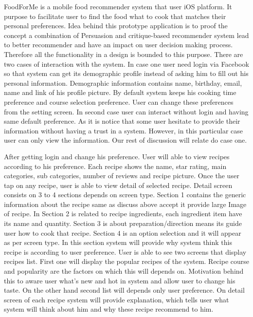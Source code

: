 FoodForMe is a mobile food recommender system that user iOS platform. It purpose to facilitate user to find the food what to cook that matches their personal preferences. Idea behind this prototype application is to proof the concept a combination of Persuasion and critique-based recommender system lead to better recommender and have an impact on user decision making process. Therefore all the functionality in a design is bounded to this purpose. There are two cases of interaction with the system. In case one user need login via Facebook so that system can get its demographic profile instead of asking him to fill out his personal information. Demographic information contains name, birthday, email, name and link of his profile picture. By default system keeps his cooking time preference and course selection preference. User can change these preferences from the setting screen. In second case user can interact without login and having same default preference. As it is notice that some user hesitate to provide their information without having a trust in a system. However, in this particular case user can only view the information. Our rest of discussion will relate do case one.\newline

After getting login and change his preference. User will able to view recipes according to his preference. Each recipe shows the name, star rating, main categories, sub categories, number of reviews and recipe picture. Once the user tap on any recipe, user is able to view detail of selected recipe. Detail screen consists on 3 to 4 sections depends on screen type. Section 1 contains the generic information about the recipe same as discuss above accept it provide large Image of recipe. In Section 2 is related to recipe ingredients, each ingredient item have its name and quantity. Section 3 is about preparation/direction means its guide user how to cook that recipe. Section 4 is an option selection and it will appear as per screen type. In this section system will provide why system think this recipe is according to user preference. User is able to see two screens that display recipes list. First one will display the popular recipes of the system. Recipe course and popularity are the factors on which this will depends on. Motivation behind this to aware user what’s new and hot in system and allow user to change his taste. On the other hand second list will depends only user preference. On detail screen of each recipe system will provide explanation, which tells user what system will think about him and why these recipe recommend to him. \newline

